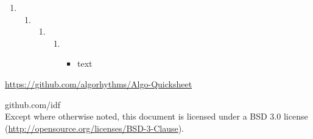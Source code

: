 \onecolumn
\begin{titlepage}

\begin{enumerate}
\item 
\begin{enumerate}
\item \begin{enumerate}
\item \begin{enumerate}
\item \begin{itemize}
\item text\end{itemize}\end{enumerate}\end{enumerate}\end{enumerate}
\end{enumerate}\url{https://github.com/algorhythms/Algo-Quicksheet}

\end{titlepage}

\newpage

\noindent {} github.com/idf \\
Except where otherwise noted, this document is licensed under a BSD 3.0
license (\url{http://opensource.org/licenses/BSD-3-Clause}).
